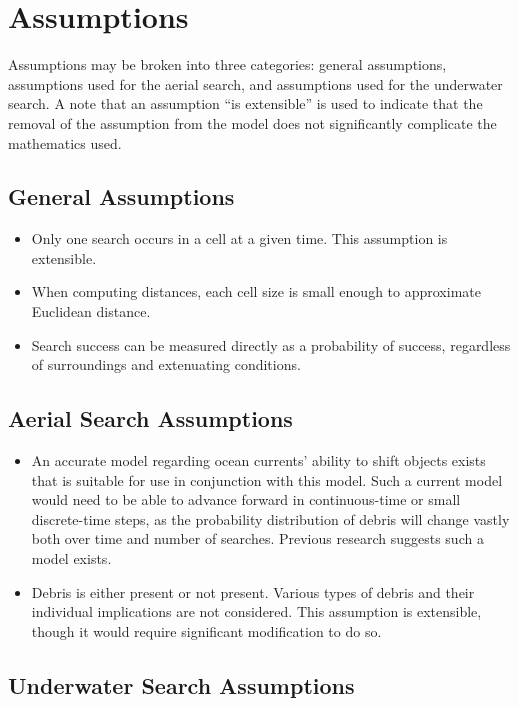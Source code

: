 \section{Assumptions}

Assumptions may be broken into three categories: general assumptions, assumptions used for the aerial search, and assumptions used for the underwater search. A note that an assumption ``is extensible'' is used to indicate that the removal of the assumption from the model does not significantly complicate the mathematics used.

\subsection{General Assumptions}

\begin{itemize}
\item Only one search occurs in a cell at a given time. This assumption is extensible.
\item When computing distances, each cell size is small enough to approximate Euclidean distance.
\item Search success can be measured directly as a probability of success, regardless of surroundings and extenuating conditions.
\end{itemize}

\subsection{Aerial Search Assumptions}

\begin{itemize}
\item An accurate model regarding ocean currents' ability to shift objects exists that is suitable for use in conjunction with this model. Such a current model would need to be able to advance forward in continuous-time or small discrete-time steps, as the probability distribution of debris will change vastly both over time and number of searches. Previous research suggests such a model exists.
\item Debris is either present or not present. Various types of debris and their individual implications are not considered. This assumption is extensible, though it would require significant modification to do so.
\end{itemize}

\subsection{Underwater Search Assumptions}

